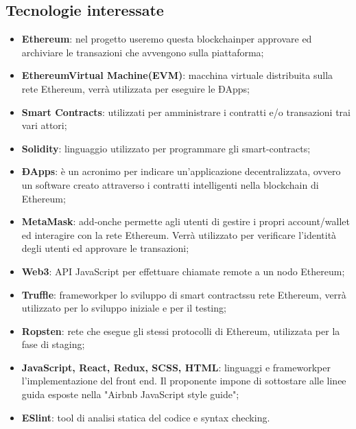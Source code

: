 \subsection{Tecnologie interessate}
\begin{itemize}
  
	\item \textbf{Ethereum\glo}: nel progetto useremo questa blockchain\glosp per approvare ed archiviare le transazioni che avvengono sulla piattaforma;
	\item \textbf{Ethereum\glosp Virtual Machine\glosp (EVM\glo)}: macchina virtuale distribuita sulla rete Ethereum\glo, verrà utilizzata per eseguire le ÐApps\glo; 
	\item \textbf{Smart Contracts\glo}: utilizzati per amministrare i contratti e/o transazioni trai vari attori;
	\item \textbf{Solidity}: linguaggio utilizzato per programmare gli smart-contracts\glo;
	\item \textbf{ÐApps\glo}: è un acronimo per indicare un'applicazione decentralizzata, ovvero un software creato attraverso i contratti intelligenti nella blockchain di Ethereum\glo;
	\item \textbf{MetaMask\glo}: add-on\glosp che permette agli utenti di gestire i propri account/wallet ed interagire con la rete Ethereum\glo. Verrà utilizzato per verificare l'identità degli utenti ed approvare le transazioni; 
	\item \textbf{Web3}: API JavaScript per effettuare chiamate remote a un nodo Ethereum\glo;
	\item \textbf{Truffle}: framework\glosp per lo sviluppo di smart contracts\glosp su rete Ethereum\glo, verrà utilizzato per lo sviluppo iniziale e per il testing;
	\item \textbf {Ropsten}: rete che esegue gli stessi protocolli di Ethereum\glo, utilizzata per la fase di staging\glo;
	\item \textbf{JavaScript, React\glo, Redux\glo, SCSS\glo, HTML}: linguaggi e framework\glosp per l'implementazione del front end\glo. Il proponente impone di sottostare alle linee guida esposte nella "Airbnb JavaScript style guide";
	\item \textbf{ESlint\glo}: tool di analisi statica del codice e syntax checking.

\end{itemize}

